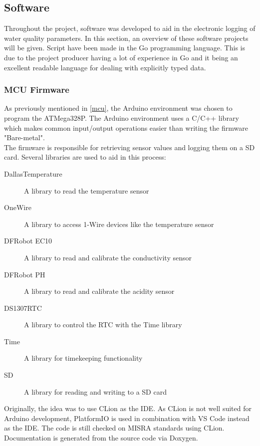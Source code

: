 \newpage
\subsection{Software}
Throughout the project, software was developed to aid in the electronic logging of water quality parameters. In this section, an overview of these software projects will be given. Script have been made in the Go programming language. This is due to the project producer having a lot of experience in Go and it being an excellent readable language for dealing with explicitly typed data.

\subsubsection{MCU Firmware}
As previously mentioned in \ref{mcu}, the Arduino environment was chosen to program the ATMega328P. The Arduino environment uses a C/C++ library which makes common input/output operations easier than writing the firmware "Bare-metal".\\

The firmware \cite{rwsuufirmware} is responsible for retrieving sensor values and logging them on a \gls{SD} card. Several libraries are used to aid in this process:

\begin{description}
   \item[DallasTemperature \cite{Dallas}] A library to read the temperature sensor
   \item[OneWire] \cite{OneWire} A library to access 1-Wire devices like the temperature sensor
   \item[DFRobot EC10] \cite{ec10} A library to read and calibrate the conductivity sensor
   \item[DFRobot PH] \cite{phlibrary} A library to read and calibrate the acidity sensor
   \item[DS1307RTC] \cite{DS1307RTC} A library to control the \gls{RTC} with the Time library
   \item[Time] \cite{timelibrary} A library for timekeeping functionality
   \item[SD] \cite{sdlibrary} A library for reading and writing to a SD card
\end{description}

Originally, the idea was to use CLion as the \gls{IDE}. As CLion is not well suited for Arduino development, PlatformIO \cite{platformio} is used in combination with VS Code instead as the \gls{IDE}. The code is still checked on MISRA standards using CLion. Documentation is generated from the source code via Doxygen. \cite{doxygen}
\newpage
